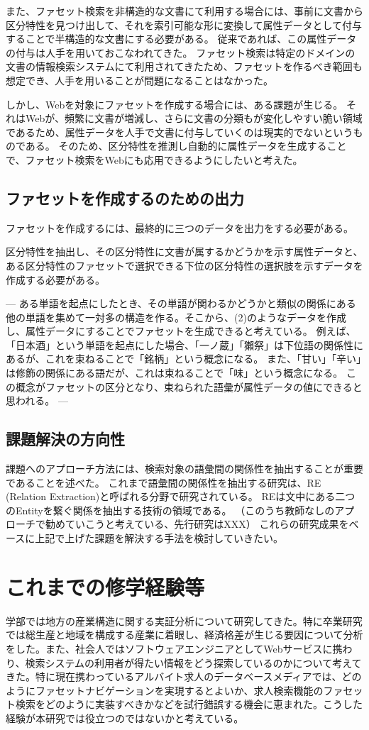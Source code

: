 \documentclass[a4j,10pt, twocolumn]{jarticle} \usepackage[dvipdfmx]{graphicx} \usepackage{amssymb} \usepackage{amsmath}
\begin{document}
  また、ファセット検索を非構造的な文書にて利用する場合には、事前に文書から区分特性を見つけ出して、それを索引可能な形に変換して属性データとして付与することで半構造的な文書にする必要がある。
  従来であれば、この属性データの付与は人手を用いておこなわれてきた。
  ファセット検索は特定のドメインの文書の情報検索システムにて利用されてきたため、ファセットを作るべき範囲も想定でき、人手を用いることが問題になることはなかった。

  しかし、Webを対象にファセットを作成する場合には、ある課題が生じる。
  それはWebが、頻繁に文書が増減し、さらに文書の分類もが変化しやすい脆い領域であるため、属性データを人手で文書に付与していくのは現実的でないというものである。
  そのため、区分特性を推測し自動的に属性データを生成することで、ファセット検索をWebにも応用できるようにしたいと考えた。

\subsection{ファセットを作成するのための出力}
ファセットを作成するには、最終的に三つのデータを出力をする必要がある。

区分特性を抽出し、その区分特性に文書が属するかどうかを示す属性データと、ある区分特性のファセットで選択できる下位の区分特性の選択肢を示すデータを作成する必要がある。

---
ある単語を起点にしたとき、その単語が関わるかどうかと類似の関係にある他の単語を集めて一対多の構造を作る。そこから、(2)のようなデータを作成し、属性データにすることでファセットを生成できると考えている。
  例えば、「日本酒」という単語を起点にした場合、「一ノ蔵」「獺祭」は下位語の関係性にあるが、これを束ねることで「銘柄」という概念になる。
  また、「甘い」「辛い」は修飾の関係にある語だが、これは束ねることで「味」という概念になる。
  この概念がファセットの区分となり、束ねられた語彙が属性データの値にできると思われる。
---

\subsection{課題解決の方向性}
  課題へのアプローチ方法には、検索対象の語彙間の関係性を抽出することが重要であることを述べた。
  これまで語彙間の関係性を抽出する研究は、RE (Relation Extraction)と呼ばれる分野で研究されている。
  REは文中にある二つのEntityを繋ぐ関係を抽出する技術の領域である。
  （このうち教師なしのアプローチで勧めていこうと考えている、先行研究はXXX）
  これらの研究成果をベースに上記で上げた課題を解決する手法を検討していきたい。

\section{これまでの修学経験等}
 学部では地方の産業構造に関する実証分析について研究してきた。特に卒業研究では総生産と地域を構成する産業に着眼し、経済格差が生じる要因について分析をした。また、社会人ではソフトウェアエンジニアとしてWebサービスに携わり、検索システムの利用者が得たい情報をどう探索しているのかについて考えてきた。特に現在携わっているアルバイト求人のデータベースメディアでは、どのようにファセットナビゲーションを実現するとよいか、求人検索機能のファセット検索をどのように実装すべきかなどを試行錯誤する機会に恵まれた。こうした経験が本研究では役立つのではないかと考えている。
\end{document}

